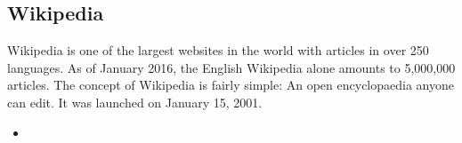 \subsection{Wikipedia}
Wikipedia is one of the largest websites in the world with articles in over 250 languages. As of January 2016, the English Wikipedia alone amounts to 5,000,000 articles. 
The concept of Wikipedia is fairly simple: An open encyclopaedia anyone can edit. It was launched on January 15, 2001. 


\begin{itemize}
\item
\end{itemize}


